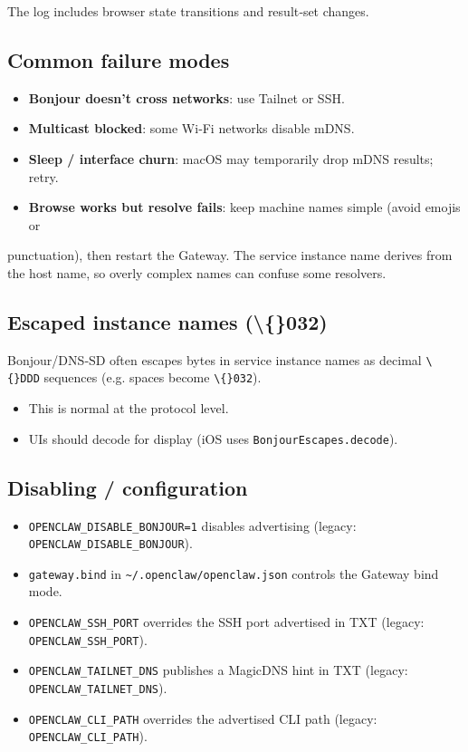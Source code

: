 The log includes browser state transitions and result‑set changes.

\subsection{Common failure modes}


\begin{itemize}
  \item \textbf{Bonjour doesn’t cross networks}: use Tailnet or SSH.
  \item \textbf{Multicast blocked}: some Wi‑Fi networks disable mDNS.
  \item \textbf{Sleep / interface churn}: macOS may temporarily drop mDNS results; retry.
  \item \textbf{Browse works but resolve fails}: keep machine names simple (avoid emojis or
\end{itemize}

punctuation), then restart the Gateway. The service instance name derives from
the host name, so overly complex names can confuse some resolvers.

\subsection{Escaped instance names (\textbackslash\{\}032)}


Bonjour/DNS‑SD often escapes bytes in service instance names as decimal \texttt{\textbackslash\{\}DDD}
sequences (e.g. spaces become \texttt{\textbackslash\{\}032}).

\begin{itemize}
  \item This is normal at the protocol level.
  \item UIs should decode for display (iOS uses \texttt{BonjourEscapes.decode}).
\end{itemize}


\subsection{Disabling / configuration}


\begin{itemize}
  \item \texttt{OPENCLAW\_DISABLE\_BONJOUR=1} disables advertising (legacy: \texttt{OPENCLAW\_DISABLE\_BONJOUR}).
  \item \texttt{gateway.bind} in \texttt{\textasciitilde{}/.openclaw/openclaw.json} controls the Gateway bind mode.
  \item \texttt{OPENCLAW\_SSH\_PORT} overrides the SSH port advertised in TXT (legacy: \texttt{OPENCLAW\_SSH\_PORT}).
  \item \texttt{OPENCLAW\_TAILNET\_DNS} publishes a MagicDNS hint in TXT (legacy: \texttt{OPENCLAW\_TAILNET\_DNS}).
  \item \texttt{OPENCLAW\_CLI\_PATH} overrides the advertised CLI path (legacy: \texttt{OPENCLAW\_CLI\_PATH}).
\end{itemize}


